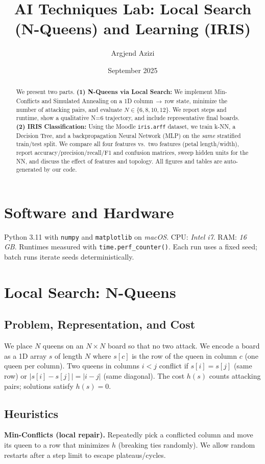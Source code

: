 \documentclass[11pt,a4paper]{article}
\title{AI Techniques Lab: Local Search (N-Queens) and Learning (IRIS)}
\author{Argjend Azizi\quad 212258162}
\date{September 2025}
\begin{document}
\maketitle

\begin{abstract}
We present two parts. \textbf{(1) N-Queens via Local Search:} We implement Min-Conflicts and Simulated Annealing on a 1D column\,$\rightarrow$\,row state, minimize the number of attacking pairs, and evaluate $N\in\{6,8,10,12\}$. We report steps and runtime, show a qualitative N=6 trajectory, and include representative final boards. \textbf{(2) IRIS Classification:} Using the Moodle \verb|iris.arff| dataset, we train k-NN, a Decision Tree, and a backpropagation Neural Network (MLP) on the \emph{same} stratified train/test split. We compare all four features vs.\ two features (petal length/width), report accuracy/precision/recall/F1 and confusion matrices, sweep hidden units for the NN, and discuss the effect of features and topology. All figures and tables are auto-generated by our code.
\end{abstract}

\section{Software and Hardware}
Python 3.11 with \texttt{numpy} and \texttt{matplotlib} on \emph{macOS}. CPU: \emph{Intel i7}. RAM: \emph{16 GB}. Runtimes measured with \verb|time.perf_counter()|. Each run uses a fixed seed; batch runs iterate seeds deterministically.

\section{Local Search: N-Queens}
\subsection{Problem, Representation, and Cost}
We place $N$ queens on an $N\times N$ board so that no two attack. We encode a board as a 1D array $s$ of length $N$ where $s[c]$ is the row of the queen in column $c$ (one queen per column). Two queens in columns $i<j$ conflict if $s[i]=s[j]$ (same row) or $\lvert s[i]-s[j]\rvert=\lvert i-j\rvert$ (same diagonal). The cost $h(s)$ counts attacking pairs; solutions satisfy $h(s)=0$.

\subsection{Heuristics}
\textbf{Min-Conflicts (local repair).} Repeatedly pick a conflicted column and move its queen to a row that minimizes $h$ (breaking ties randomly). We allow random restarts after a step limit to escape plateaus/cycles.
\end{document}
